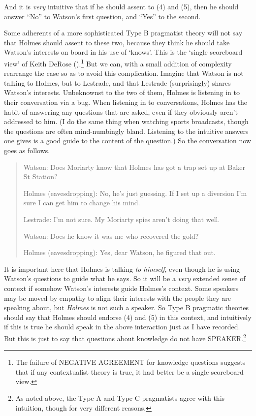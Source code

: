 \documentclass[
  11pt,
  letterpaper,
  DIV=11,
  numbers=noendperiod,
  twoside]{scrartcl}
\begin{document}
And it is \emph{very} intuitive that if he should assent to (4) and (5),
then he should answer ``No'' to Watson's first question, and ``Yes'' to
the second.

Some adherents of a more sophisticated Type B pragmatist theory will not
say that Holmes should assent to these two, because they think he should
take Watson's interests on board in his use of `knows'. This is the
`single scoreboard view' of Keith DeRose
().\footnote{The failure of NEGATIVE
  AGREEMENT for knowledge questions suggests that if any contextualist
  theory is true, it had better be a single scoreboard view.} But we
can, with a small addition of complexity rearrange the case so as to
avoid this complication. Imagine that Watson is not talking to Holmes,
but to Lestrade, and that Lestrade (surprisingly) shares Watson's
interests. Unbeknownst to the two of them, Holmes is listening in to
their conversation via a bug. When listening in to conversations, Holmes
has the habit of answering any questions that are asked, even if they
obviously aren't addressed to him. (I do the same thing when watching
sports broadcasts, though the questions are often mind-numbingly bland.
Listening to the intuitive answers one gives is a good guide to the
content of the question.) So the conversation now goes as follows.

\begin{quote}
Watson: Does Moriarty know that Holmes has got a trap set up at Baker St
Station?

Holmes (eavesdropping): No, he's just guessing. If I set up a diversion
I'm sure I can get him to change his mind.

Lestrade: I'm not sure. My Moriarty spies aren't doing that well.

Watson: Does he know it was me who recovered the gold?

Holmes (eavesdropping): Yes, dear Watson, he figured that out.
\end{quote}

It is important here that Holmes is talking \emph{to himself}, even
though he is using Watson's questions to guide what he says. So it will
be a \emph{very} extended sense of context if somehow Watson's interests
guide Holmes's context. Some speakers may be moved by empathy to align
their interests with the people they are speaking about, but
\emph{Holmes} is not such a speaker. So Type B pragmatic theories should
say that Holmes should endorse (4) and (5) in this context, and
intuitively if this is true he should speak in the above interaction
just as I have recorded. But this is just to say that questions about
knowledge do not have SPEAKER.\footnote{As noted above, the Type A and
  Type C pragmatists agree with this intuition, though for very
  different reasons.}
\end{document}

